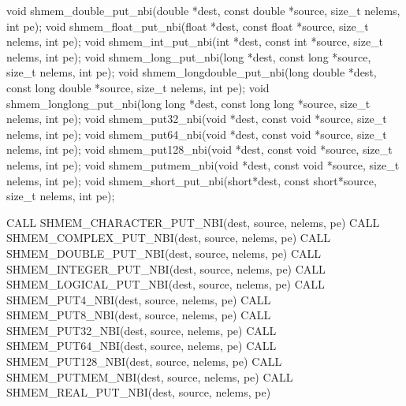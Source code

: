 
\begin{apidefinition}

\begin{Csynopsis}
void shmem_double_put_nbi(double *dest, const double *source, size_t nelems, int pe);
void shmem_float_put_nbi(float *dest, const float *source, size_t nelems, int pe);
void shmem_int_put_nbi(int *dest, const int *source, size_t nelems, int pe);
void shmem_long_put_nbi(long *dest, const long *source, size_t nelems, int pe);
void shmem_longdouble_put_nbi(long double *dest, const long double *source, size_t nelems, int pe);
void shmem_longlong_put_nbi(long long *dest, const long long *source, size_t nelems, int pe);
void shmem_put32_nbi(void *dest, const void *source, size_t nelems, int pe);
void shmem_put64_nbi(void *dest, const void *source, size_t nelems, int pe);
void shmem_put128_nbi(void *dest, const void *source, size_t nelems, int pe);
void shmem_putmem_nbi(void *dest, const void *source, size_t nelems, int pe);
void shmem_short_put_nbi(short*dest, const short*source, size_t nelems, int pe);
\end{Csynopsis}

\begin{Fsynopsis}
CALL SHMEM_CHARACTER_PUT_NBI(dest, source, nelems, pe)
CALL SHMEM_COMPLEX_PUT_NBI(dest, source, nelems, pe)
CALL SHMEM_DOUBLE_PUT_NBI(dest, source, nelems, pe)
CALL SHMEM_INTEGER_PUT_NBI(dest, source, nelems, pe)
CALL SHMEM_LOGICAL_PUT_NBI(dest, source, nelems, pe)
CALL SHMEM_PUT4_NBI(dest, source, nelems, pe)
CALL SHMEM_PUT8_NBI(dest, source, nelems, pe)
CALL SHMEM_PUT32_NBI(dest, source, nelems, pe)
CALL SHMEM_PUT64_NBI(dest, source, nelems, pe)
CALL SHMEM_PUT128_NBI(dest, source, nelems, pe)
CALL SHMEM_PUTMEM_NBI(dest, source, nelems, pe)
CALL SHMEM_REAL_PUT_NBI(dest, source, nelems, pe)
\end{Fsynopsis}

\begin{apiarguments}
\end{apiarguments}


\end{apidefinition}
